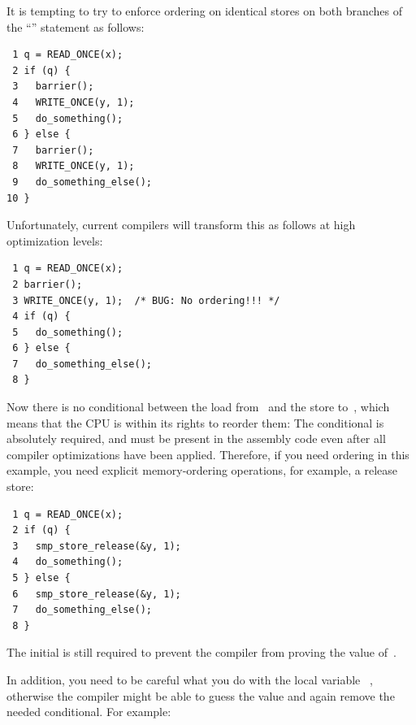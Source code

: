 It is tempting to try to enforce ordering on identical stores on both
branches of the ``'' statement as follows:

\vspace{5pt}
\begin{minipage}[t]{\columnwidth}
\scriptsize
\begin{verbatim}
 1 q = READ_ONCE(x);
 2 if (q) {
 3   barrier();
 4   WRITE_ONCE(y, 1);
 5   do_something();
 6 } else {
 7   barrier();
 8   WRITE_ONCE(y, 1);
 9   do_something_else();
10 }
\end{verbatim}
\end{minipage}
\vspace{5pt}

Unfortunately, current compilers will transform this as follows at high
optimization levels:

\vspace{5pt}
\begin{minipage}[t]{\columnwidth}
\scriptsize
\begin{verbatim}
 1 q = READ_ONCE(x);
 2 barrier();
 3 WRITE_ONCE(y, 1);  /* BUG: No ordering!!! */
 4 if (q) {
 5   do_something();
 6 } else {
 7   do_something_else();
 8 }
\end{verbatim}
\end{minipage}
\vspace{5pt}

Now there is no conditional between the load from~ and the store
to~, which means that the CPU is within its rights to reorder them:
The conditional is absolutely required, and must be present in the
assembly code even after all compiler optimizations have been applied.
Therefore, if you need ordering in this example, you need explicit
memory-ordering operations, for example, a release store:

\vspace{5pt}
\begin{minipage}[t]{\columnwidth}
\scriptsize
\begin{verbatim}
 1 q = READ_ONCE(x);
 2 if (q) {
 3   smp_store_release(&y, 1);
 4   do_something();
 5 } else {
 6   smp_store_release(&y, 1);
 7   do_something_else();
 8 }
\end{verbatim}
\end{minipage}
\vspace{5pt}

The initial  is still required to prevent the compiler from
proving the value of~.

In addition, you need to be careful what you do with the local variable~%
,
otherwise the compiler might be able to guess the value and again remove
the needed conditional.
For example:

